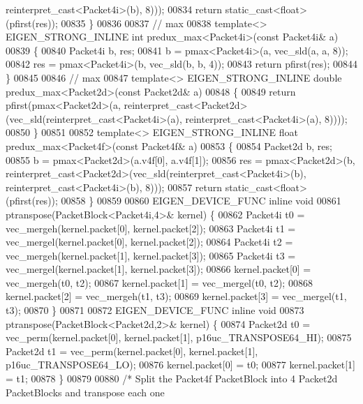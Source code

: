 \begin{DoxyCode}
{      reinterpret\_cast<Packet4i>(b), 8)));
00834   \textcolor{keywordflow}{return} \textcolor{keyword}{static\_cast<}\textcolor{keywordtype}{float}\textcolor{keyword}{>}(pfirst(res));
00835 \}
00836 
00837 \textcolor{comment}{// max}
00838 \textcolor{keyword}{template}<> EIGEN\_STRONG\_INLINE \textcolor{keywordtype}{int} predux\_max<Packet4i>(\textcolor{keyword}{const} Packet4i& a)
00839 \{
00840   Packet4i b, res;
00841   b = pmax<Packet4i>(a, vec\_sld(a, a, 8));
00842   res = pmax<Packet4i>(b, vec\_sld(b, b, 4));
00843   \textcolor{keywordflow}{return} pfirst(res);
00844 \}
00845 
00846 \textcolor{comment}{// max}
00847 \textcolor{keyword}{template}<> EIGEN\_STRONG\_INLINE \textcolor{keywordtype}{double} predux\_max<Packet2d>(\textcolor{keyword}{const} Packet2d& a)
00848 \{
00849   \textcolor{keywordflow}{return} pfirst(pmax<Packet2d>(a, reinterpret\_cast<Packet2d>(vec\_sld(reinterpret\_cast<Packet4i>(a), 
      reinterpret\_cast<Packet4i>(a), 8))));
00850 \}
00851 
00852 \textcolor{keyword}{template}<> EIGEN\_STRONG\_INLINE \textcolor{keywordtype}{float} predux\_max<Packet4f>(\textcolor{keyword}{const} Packet4f& a)
00853 \{
00854   Packet2d b, res;
00855   b   = pmax<Packet2d>(a.v4f[0], a.v4f[1]);
00856   res = pmax<Packet2d>(b, \textcolor{keyword}{reinterpret\_cast<}Packet2d\textcolor{keyword}{>}(vec\_sld(reinterpret\_cast<Packet4i>(b), 
      reinterpret\_cast<Packet4i>(b), 8)));
00857   \textcolor{keywordflow}{return} \textcolor{keyword}{static\_cast<}\textcolor{keywordtype}{float}\textcolor{keyword}{>}(pfirst(res));
00858 \}
00859 
00860 EIGEN\_DEVICE\_FUNC \textcolor{keyword}{inline} \textcolor{keywordtype}{void}
00861 ptranspose(PacketBlock<Packet4i,4>& kernel) \{
00862   Packet4i t0 = vec\_mergeh(kernel.packet[0], kernel.packet[2]);
00863   Packet4i t1 = vec\_mergel(kernel.packet[0], kernel.packet[2]);
00864   Packet4i t2 = vec\_mergeh(kernel.packet[1], kernel.packet[3]);
00865   Packet4i t3 = vec\_mergel(kernel.packet[1], kernel.packet[3]);
00866   kernel.packet[0] = vec\_mergeh(t0, t2);
00867   kernel.packet[1] = vec\_mergel(t0, t2);
00868   kernel.packet[2] = vec\_mergeh(t1, t3);
00869   kernel.packet[3] = vec\_mergel(t1, t3);
00870 \}
00871 
00872 EIGEN\_DEVICE\_FUNC \textcolor{keyword}{inline} \textcolor{keywordtype}{void}
00873 ptranspose(PacketBlock<Packet2d,2>& kernel) \{
00874   Packet2d t0 = vec\_perm(kernel.packet[0], kernel.packet[1], p16uc\_TRANSPOSE64\_HI);
00875   Packet2d t1 = vec\_perm(kernel.packet[0], kernel.packet[1], p16uc\_TRANSPOSE64\_LO);
00876   kernel.packet[0] = t0;
00877   kernel.packet[1] = t1;
00878 \}
00879 
00880 \textcolor{comment}{/* Split the Packet4f PacketBlock into 4 Packet2d PacketBlocks and transpose each one}
}
\end{DoxyCode}
